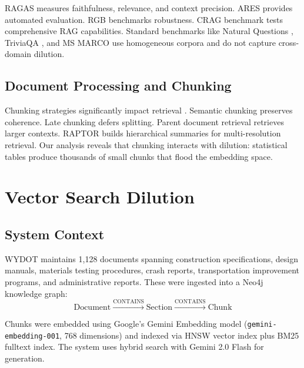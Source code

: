 \documentclass[11pt,a4paper]{article}
\newcommand{\numDocs}{1{,}128}
\begin{document}
RAGAS \cite{es2024ragas} measures faithfulness, relevance, and context precision. ARES \cite{saadfalcon2024ares} provides automated evaluation. RGB \cite{chen2024rgb} benchmarks robustness. CRAG benchmark \cite{yang2024crag} tests comprehensive RAG capabilities. Standard benchmarks like Natural Questions \cite{kwiatkowski2019naturalquestions}, TriviaQA \cite{joshi2017triviaqa}, and MS MARCO \cite{nguyen2016msmarco} use homogeneous corpora and do not capture cross-domain dilution.

\subsection{Document Processing and Chunking}

Chunking strategies significantly impact retrieval \cite{langchain2024textsplitters}. Semantic chunking \cite{kamradt2024semantic} preserves coherence. Late chunking \cite{gunther2024latechunking} defers splitting. Parent document retrieval \cite{langchain2024parentdoc} retrieves larger contexts. RAPTOR \cite{sarthi2024raptor} builds hierarchical summaries for multi-resolution retrieval. Our analysis reveals that chunking interacts with dilution: statistical tables produce thousands of small chunks that flood the embedding space.


\section{Vector Search Dilution}
\label{sec:dilution}

\subsection{System Context}

WYDOT maintains \numDocs{} documents spanning construction specifications, design manuals, materials testing procedures, crash reports, transportation improvement programs, and administrative reports. These were ingested into a Neo4j knowledge graph:
\begin{equation}
\text{Document} \xrightarrow{\text{CONTAINS}} \text{Section} \xrightarrow{\text{CONTAINS}} \text{Chunk}
\end{equation}

Chunks were embedded using Google's Gemini Embedding model (\texttt{gemini-embedding-001}, 768 dimensions) and indexed via HNSW vector index plus BM25 fulltext index. The system uses hybrid search \cite{chen2024blendedrag} with Gemini 2.0 Flash for generation.
\end{document}
